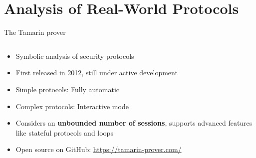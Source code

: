 \documentclass[11pt,aspectratio=169]{beamer}
\begin{document}

\section{Analysis of Real-World Protocols}


\begin{frame}[fragile]{The Tamarin prover}
    \begin{columns}
        \begin{column}{0.6\textwidth}
            \begin{itemize}
                \item Symbolic analysis of security protocols
                \item First released in 2012, still under active development
                \item Simple protocols: Fully automatic
                \item Complex protocols: Interactive mode
                \item Considers an \textbf{unbounded number of sessions}, 
                      supports advanced features like stateful protocols and 
                      loops
                \item Open source on GitHub: \url{https://tamarin-prover.com/}
            \end{itemize}
        \end{column}
\end{columns}
\end{frame}
\end{document}
